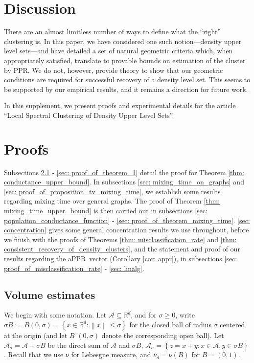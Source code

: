 \documentclass{article}
\newcommand{\set}[1]{\left\{#1\right\}}
\newcommand{\Reals}{\mathbb{R}}
\newcommand{\Rd}{\Reals^d}
\newcommand{\norm}[1]{\left\lVert#1\right\rVert}
\newcommand{\1}{\mathbf{1}}
\newcommand{\Aset}{\mathcal{A}}
\newcommand{\Asig}{\Aset_{\sigma}}
\newcommand{\pprspace}{{\sc PPR~}}
\theoremstyle{aldenthm}
\theoremstyle{aldenrmrk}
\begin{document}
\section{Discussion}
\label{sec: discussion}

There are an almost limitless number of ways to define what the ``right''
clustering is. In this paper, we have considered one such notion---density upper
level sets---and have detailed a set of natural geometric criteria which, when 
appropriately satisfied, translate to provable bounds on estimation of the
cluster by PPR. We do not, however, provide theory to show that our geometric
conditions are required for successful recovery of a density level set. This
seems to be supported by our empirical results, and it remains a direction for 
future work.  

\clearpage
\appendix

In this supplement, we present proofs and experimental details for the article ``Local Spectral Clustering of Density Upper Level Sets''.

\section{Proofs}

Subsections \ref{sec: volume_estimates} - \ref{sec: proof_of_theorem_1} detail the proof for Theorem \ref{thm: conductance_upper_bound}. In subsections \ref{sec: mixing_time_on_graphs} and \ref{sec: proof_of_proposition_tv_mixing_time}, we establish some results regarding mixing time over general graphs. The proof of Theorem \ref{thm: mixing_time_upper_bound} is then carried out in subsections \ref{sec: population_conductance_function} - \ref{sec: proof_of_theorem_mixing_time}. \ref{sec: concentration} gives some general concentration results we use throughout, before we finish with the proofs of Theorems \ref{thm: misclassification_rate} and \ref{thm: consistent_recovery_of_density_clusters}, and the statement and proof of our results regarding the a\pprspace vector (Corollary \ref{cor: appr}), in subsections \ref{sec: proof_of_misclassification_rate} - \ref{sec: linalg}.

\subsection{Volume estimates}
\label{sec: volume_estimates}

We begin with some notation. Let $\Aset \subseteq \Reals^d$, and for $\sigma \geq 0$, write $\sigma B := B(0,\sigma) = \set{x \in \Rd: \norm{x} \leq \sigma}$ for the closed ball of radius $\sigma$ centered at the origin (and let $B^{\circ}(0,\sigma)$ denote the corresponding open ball). Let $\Asig = \Aset + \sigma B$ be the direct sum of $\Aset$ and $\sigma B$, $\Asig = \set{z = x + y: x \in \Aset, y \in \sigma B}$. Recall that we use $\nu$ for Lebesgue measure, and $\nu_d = \nu(B)$ for $B = (0,1)$. 
\end{document}
